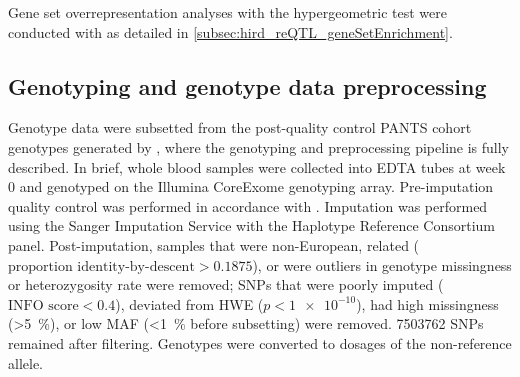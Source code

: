 Gene set overrepresentation analyses with the hypergeometric test were conducted with  as detailed in \cref{subsec:hird_reQTL_geneSetEnrichment}.


\subsection{Genotyping and genotype data preprocessing}

%
%
%
%
%
Genotype data were subsetted from the post-quality control \gls{PANTS} cohort genotypes generated by \textcite{sazonovs2019HLADQA105Carriage},
where the genotyping and preprocessing pipeline is fully described.
In brief, whole blood samples were collected into EDTA tubes at week 0 and genotyped on the Illumina CoreExome genotyping array.
Pre-imputation quality control was performed in accordance with \textcite{delange2017GenomewideAssociationStudy}.
Imputation was performed using the Sanger Imputation Service with the Haplotype Reference Consortium panel.
Post-imputation, samples that were non-European, related ($\text{proportion identity-by-descent} > 0.1875$), or were outliers in genotype missingness or heterozygosity rate were removed;
\glspl{SNP} that were poorly imputed ($\text{INFO score} < 0.4$), deviated from \gls{HWE} ($p < \num{1e-10}$), had high missingness (\SI{>5}{\percent}), or low \gls{MAF} (\SI{<1}{\percent} before subsetting) were removed.
\num{7503762} \glspl{SNP} remained after filtering.
Genotypes were converted to dosages of the non-reference allele.

